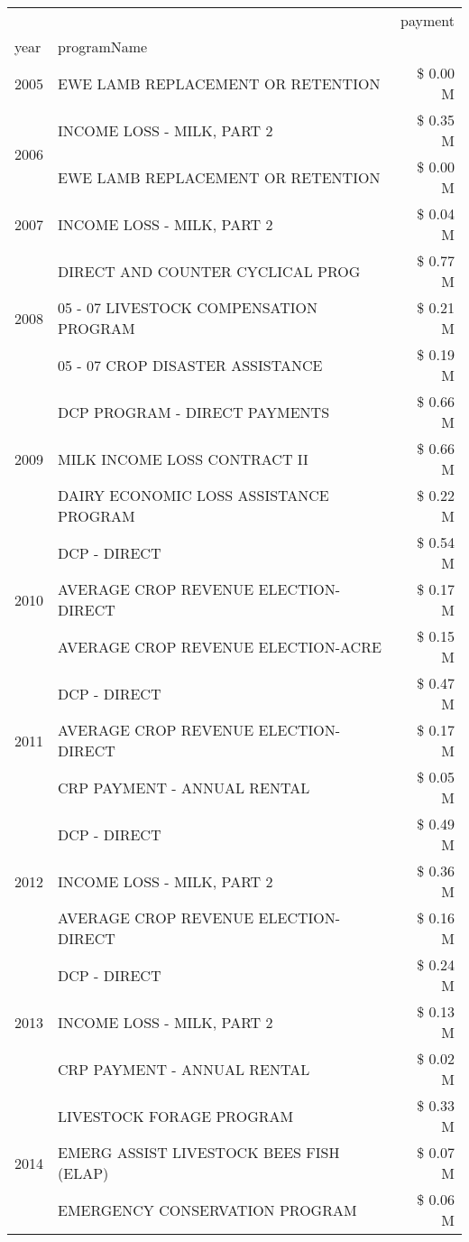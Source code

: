 \begin{tabular}{llr}
\toprule
 &  & payment \\
year & programName &  \\
\midrule
2005 & EWE LAMB REPLACEMENT OR RETENTION & \$ 0.00 M \\
\cline{1-3}
\multirow[t]{2}{*}{2006} & INCOME LOSS - MILK, PART 2 & \$ 0.35 M \\
 & EWE LAMB REPLACEMENT OR RETENTION & \$ 0.00 M \\
\cline{1-3}
2007 & INCOME LOSS - MILK, PART 2 & \$ 0.04 M \\
\cline{1-3}
\multirow[t]{3}{*}{2008} & DIRECT AND COUNTER CYCLICAL PROG & \$ 0.77 M \\
 & 05 - 07 LIVESTOCK COMPENSATION PROGRAM & \$ 0.21 M \\
 & 05 - 07 CROP DISASTER ASSISTANCE & \$ 0.19 M \\
\cline{1-3}
\multirow[t]{3}{*}{2009} & DCP PROGRAM - DIRECT PAYMENTS & \$ 0.66 M \\
 & MILK INCOME LOSS CONTRACT II & \$ 0.66 M \\
 & DAIRY ECONOMIC LOSS ASSISTANCE PROGRAM & \$ 0.22 M \\
\cline{1-3}
\multirow[t]{3}{*}{2010} & DCP - DIRECT & \$ 0.54 M \\
 & AVERAGE CROP REVENUE ELECTION-DIRECT & \$ 0.17 M \\
 & AVERAGE CROP REVENUE ELECTION-ACRE & \$ 0.15 M \\
\cline{1-3}
\multirow[t]{3}{*}{2011} & DCP - DIRECT & \$ 0.47 M \\
 & AVERAGE CROP REVENUE ELECTION-DIRECT & \$ 0.17 M \\
 & CRP PAYMENT - ANNUAL RENTAL & \$ 0.05 M \\
\cline{1-3}
\multirow[t]{3}{*}{2012} & DCP - DIRECT & \$ 0.49 M \\
 & INCOME LOSS - MILK, PART 2 & \$ 0.36 M \\
 & AVERAGE CROP REVENUE ELECTION-DIRECT & \$ 0.16 M \\
\cline{1-3}
\multirow[t]{3}{*}{2013} & DCP - DIRECT & \$ 0.24 M \\
 & INCOME LOSS - MILK, PART 2 & \$ 0.13 M \\
 & CRP PAYMENT - ANNUAL RENTAL & \$ 0.02 M \\
\cline{1-3}
\multirow[t]{3}{*}{2014} & LIVESTOCK FORAGE PROGRAM & \$ 0.33 M \\
 & EMERG ASSIST LIVESTOCK BEES FISH (ELAP) & \$ 0.07 M \\
 & EMERGENCY CONSERVATION PROGRAM & \$ 0.06 M \\

\end{tabular}
